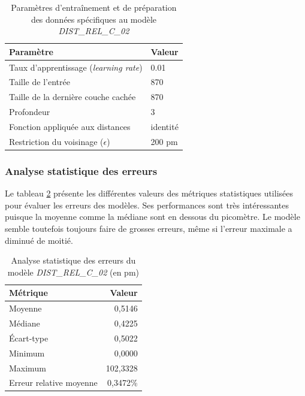 \begin{table}
	\centering
	\begin{tabular}{|l|l|}
		\hline
		\textbf{Paramètre} & \textbf{Valeur} \\ \hline
		Taux d'apprentissage (\emph{learning rate}) & 0.01 \\ \hline
		Taille de l'entrée & 870 \\ \hline
		Taille de la dernière couche cachée & 870 \\ \hline
		Profondeur & 3 \\ \hline
		Fonction appliquée aux distances & identité \\ \hline
		Restriction du voisinage ($\epsilon$) & 200 pm \\ \hline
	\end{tabular}

	\caption{Paramètres d'entraînement et de préparation des données spécifiques au modèle \emph{DIST\_REL\_C\_02}}
	\label{table_params_dist_rel_c_02}
\end{table}

\subsubsection{Analyse statistique des erreurs}
\par Le tableau \ref{table_analyse_dist_rel_c_02} présente les différentes valeurs des métriques statistiques utilisées pour évaluer les erreurs des modèles. Ses performances sont très intéressantes puisque la moyenne comme la médiane sont en dessous du picomètre. Le modèle semble toutefois toujours faire de grosses erreurs, même si l'erreur maximale a diminué de moitié.

\begin{table}
	\centering
	\begin{tabular}{|l|r|}
		\hline
		\textbf{Métrique} & \textbf{Valeur} \\ \hline
		Moyenne & 0,5146 \\ \hline
		Médiane & 0,4225 \\ \hline
		Écart-type & 0,5022 \\ \hline
		Minimum & 0,0000 \\ \hline
		Maximum & 102,3328\\ \hline
		Erreur relative moyenne & 0,3472\% \\ \hline
	\end{tabular}
	
	\caption{Analyse statistique des erreurs du modèle \emph{DIST\_REL\_C\_02} (en pm)}
	\label{table_analyse_dist_rel_c_02}
\end{table}

